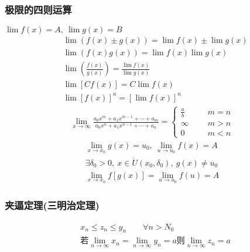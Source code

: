 \subsubsection{极限的四则运算}
$\lim f(x)=A,\ \lim g(x)=B$
\begin{align}
&\lim{(f(x)\pm g(x))} = \lim f(x)\pm\lim g(x) \label{Extreme Four Operations_1}\\
&\lim{(f(x) g(x))} = \lim f(x)\lim g(x) \label{Extreme Four Operations_2}\\
&\lim \left(\frac{f(x)}{g(x)}\right)= \frac{\lim{f(x)}}{\lim{g(x)}} \label{Extreme Four Operations_3}\\
&\lim\left[Cf(x)\right]=C\lim f(x)\\
&\lim\left[f(x)\right]^n=\left[\lim f(x)\right]^n
\end{align}
\begin{align}
    \lim\limits_{x\to \infty}\frac{a_0x^m+a_1x^{m-1}+\cdots +a_m}{a_0x^n+a_1x^{n-1}+\cdots +a_n}=\begin{cases}
        \frac{a}{b}\qquad &m=n\\
        \infty &m>n\\
        0 &m<n
    \end{cases}
\end{align}
\begin{equation}
    \begin{split}
        \lim\limits_{x\to x_0}g(x)=u_0,\ \lim\limits_{u\to u_0}f(x)=A\\
        \exists \delta_0>0,\ x\in \mathring{U}\left(x_0,\delta_0\right),\ g(x)\neq u_0\\
        \lim\limits_{x\to x_0}f\left[g(x)\right]=\lim\limits_{u\to u_0}f(u)=A
    \end{split}
\end{equation}

\subsubsection{夹逼定理(三明治定理)}
\begin{equation}\label{eq:squeeze_theorem}
\begin{split}
&x_n\leqslant z_n\leqslant y_n \qquad \forall n>N_0 \\
&\mbox{若}\lim\limits_{n\to{\infty}}x_n = \lim\limits_{n\to\infty}y_n = a \mbox{则}\lim\limits_{n\to\infty}z_n = a
\end{split}
\end{equation}

